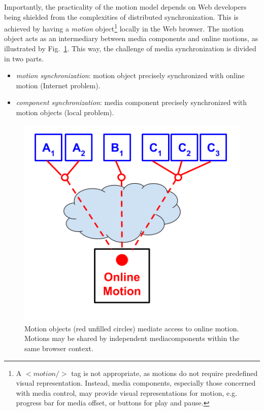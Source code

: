 Importantly, the practicality of the motion model depends on Web developers
being shielded from the complexities of distributed synchronization. This is
achieved by having a \emph{motion} object\footnote{ A $<motion/>$ tag is not
appropriate, as motions do not require predefined visual representation.
Instead, media components, especially those concerned with media control, may
provide visual representations for motion, e.g. progress bar for media offset,
or buttons for play and pause. } locally in the Web browser. The motion object
acts as an intermediary between media components and online motions, as
illustrated by Fig.~\ref{fig:model-2}. This way, the challenge of media synchronization
is divided in two parts.

\begin{itemize}
\item{\emph{motion synchronization}: motion object precisely synchronized with online motion (Internet problem).}
\item{\emph{component synchronization}: media component precisely synchronized with motion objects (local problem).} 
\end{itemize}


\begin{figure}[h]
\centering
\includegraphics[scale=.4]{fig/motion-model-2.png}
\caption{Motion objects (red unfilled circles) mediate access to online motion. Motions may be shared by independent mediacomponents within the same browser context.}
\label{fig:model-2}
\end{figure}

